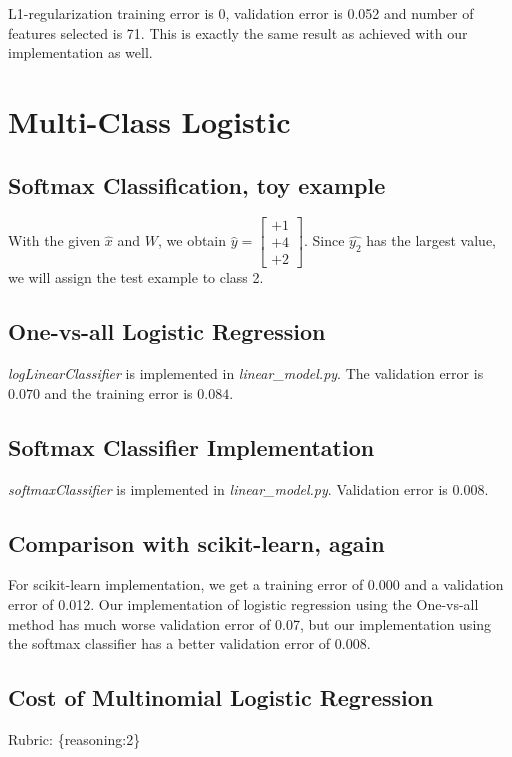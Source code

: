 \documentclass{article}
\def\rubric#1{\gre{Rubric: \{#1\}}}{}
\def\gre#1{{\color{gre}#1}}
\begin{document}
L1-regularization training error is 0, validation error is 0.052 and number of features selected is 71. This is exactly the same result as achieved with our implementation as well.



\section{Multi-Class Logistic}

\subsection{Softmax Classification, toy example}
With the given $\hat{x}$ and $W$, we obtain $\hat{y} = 
\begin{bmatrix}
+1\\
+4\\
+2
\end{bmatrix}$. Since $\hat{y_2}$ has the largest value, we will assign the test example to class 2.
													


\subsection{One-vs-all Logistic Regression}

\emph{logLinearClassifier} is implemented in \emph{linear\_model.py}. The validation error is $0.070$ and the training error is $0.084$.


\subsection{Softmax Classifier Implementation}
\emph{softmaxClassifier} is implemented in \emph{linear\_model.py}. Validation error is 0.008.



\subsection{Comparison with scikit-learn, again}

For scikit-learn implementation, we get a training error of 0.000 and a validation error of 0.012. Our implementation of logistic regression using the One-vs-all method has much worse validation error of 0.07, but our implementation using the softmax classifier has a better validation error of 0.008.


\subsection{Cost of Multinomial Logistic Regression}
\rubric{reasoning:2}
\end{document}
